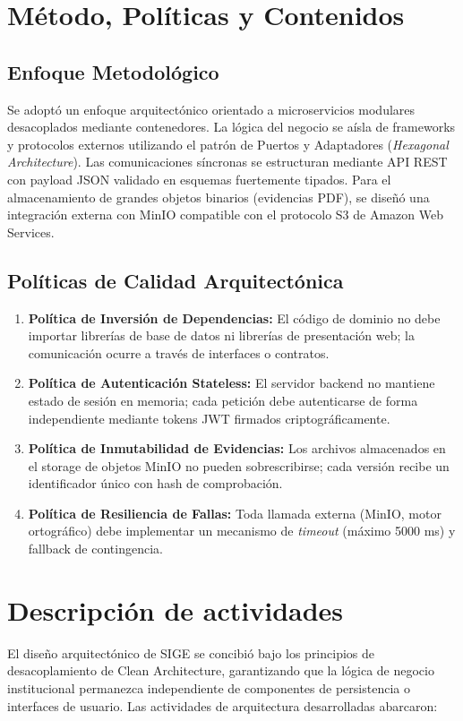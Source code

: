 \documentclass[12pt,a4paper]{article}
\begin{document}
\section{Método, Políticas y Contenidos}
\subsection{Enfoque Metodológico}
Se adoptó un enfoque arquitectónico orientado a microservicios modulares desacoplados mediante contenedores. La lógica del negocio se aísla de frameworks y protocolos externos utilizando el patrón de Puertos y Adaptadores (\textit{Hexagonal Architecture}). Las comunicaciones síncronas se estructuran mediante API REST con payload JSON validado en esquemas fuertemente tipados. Para el almacenamiento de grandes objetos binarios (evidencias PDF), se diseñó una integración externa con MinIO compatible con el protocolo S3 de Amazon Web Services.

\subsection{Políticas de Calidad Arquitectónica}
\begin{enumerate}[leftmargin=1.5em, itemsep=2pt]
    \item \textbf{Política de Inversión de Dependencias:} El código de dominio no debe importar librerías de base de datos ni librerías de presentación web; la comunicación ocurre a través de interfaces o contratos.
    \item \textbf{Política de Autenticación Stateless:} El servidor backend no mantiene estado de sesión en memoria; cada petición debe autenticarse de forma independiente mediante tokens JWT firmados criptográficamente.
    \item \textbf{Política de Inmutabilidad de Evidencias:} Los archivos almacenados en el storage de objetos MinIO no pueden sobrescribirse; cada versión recibe un identificador único con hash de comprobación.
    \item \textbf{Política de Resiliencia de Fallas:} Toda llamada externa (MinIO, motor ortográfico) debe implementar un mecanismo de \textit{timeout} (máximo 5000 ms) y fallback de contingencia.
\end{enumerate}

\section{Descripción de actividades}
El diseño arquitectónico de SIGE se concibió bajo los principios de desacoplamiento de Clean Architecture, garantizando que la lógica de negocio institucional permanezca independiente de componentes de persistencia o interfaces de usuario. Las actividades de arquitectura desarrolladas abarcaron:
\end{document}
